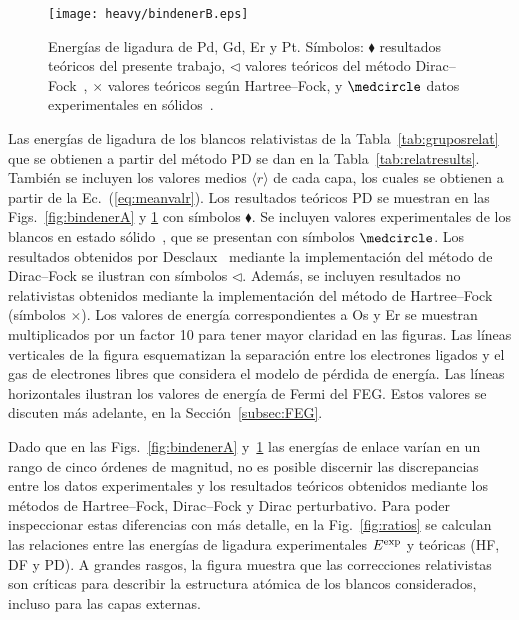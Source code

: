 \begin{figure}
\centering
\texttt{[image: heavy/bindenerB.eps]} 
\caption[Energías de ligadura de blancos relativistas]
{Energías de ligadura de Pd, Gd, Er y Pt. Símbolos: $\blacklozenge$ 
resultados teóricos del presente trabajo, $\triangleleft$ valores 
teóricos del método Dirac--Fock~\cite{Desclaux:73}, $\times$ valores 
teóricos según Hartree--Fock, y $\medcircle$ datos experimentales en 
sólidos~\cite{Williams:95}.}
\label{fig:bindenerB}
\end{figure}

Las energías de ligadura de los blancos relativistas de la 
Tabla~\ref{tab:gruposrelat} que se obtienen a partir del método PD se 
dan en la Tabla~\ref{tab:relatresults}. También se incluyen los valores 
medios $\langle r\rangle$ de cada capa, los cuales se obtienen a partir 
de la Ec.~(\ref{eq:meanvalr}). Los resultados teóricos PD se muestran en 
las Figs.~\ref{fig:bindenerA} y \ref{fig:bindenerB} con símbolos 
$\blacklozenge$. Se incluyen valores experimentales de los blancos en 
estado sólido~\cite{Williams:95}, que se presentan con símbolos 
$\medcircle$. Los resultados obtenidos por Desclaux~\cite{Desclaux:73} 
mediante la implementación del método de Dirac--Fock se ilustran con 
símbolos $\triangleleft$. Además, se incluyen resultados no relativistas 
obtenidos mediante la implementación del método de 
Hartree--Fock~\cite{FroeseFischer:97} (símbolos $\times$). Los valores 
de energía correspondientes a Os y Er se muestran multiplicados por un 
factor 10 para tener mayor claridad en las figuras. Las líneas 
verticales de la figura esquematizan la separación entre los electrones 
ligados y el gas de electrones libres que considera el modelo de pérdida 
de energía. Las líneas horizontales ilustran los valores de energía de 
Fermi del FEG. Estos valores se  discuten más adelante, en la 
Sección~\ref{subsec:FEG}.

Dado que en las Figs.~\ref{fig:bindenerA} y~\ref{fig:bindenerB} las 
energías de enlace varían en un rango de cinco órdenes de magnitud, no 
es posible discernir las discrepancias entre los datos experimentales y 
los resultados teóricos obtenidos mediante los métodos de Hartree--Fock, 
Dirac--Fock y Dirac perturbativo. Para poder inspeccionar estas 
diferencias con más detalle, en la Fig.~\ref{fig:ratios} se calculan las 
relaciones entre las energías de ligadura experimentales 
$E^{\mbox{\scriptsize exp}}$ y teóricas (HF, DF y PD). A grandes rasgos,
la figura muestra que las correcciones relativistas son críticas para 
describir la estructura atómica de los blancos considerados, incluso 
para las capas externas. 

